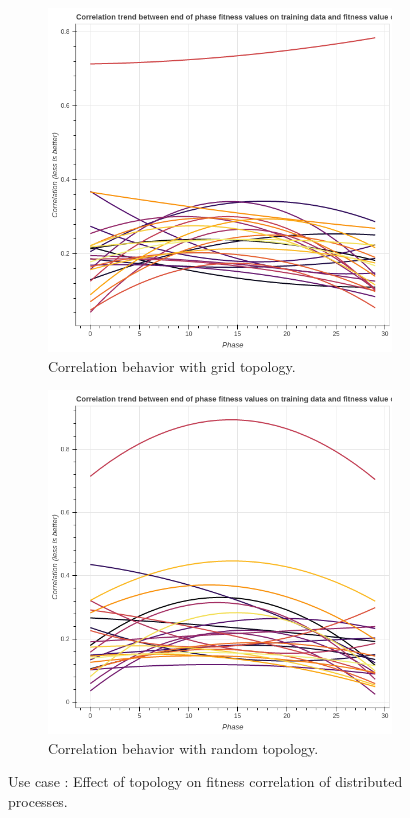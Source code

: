 \begin{figure}
\begin{subfigure}{0.5\textwidth}
        \includegraphics[width=0.8\linewidth]{figures/usecasecorrgrid.png}
        \caption{Correlation behavior with grid topology.}
    \end{subfigure}
    \begin{subfigure}{0.5\textwidth}
        \includegraphics[width=0.8\linewidth]{figures/usecasecorrrandom.png}
        \caption{Correlation behavior with random topology.}
    \end{subfigure}
    \caption{Use case : Effect of topology on fitness correlation of distributed processes.}
    \label{fig:usecasecorrelation}
\end{figure}
